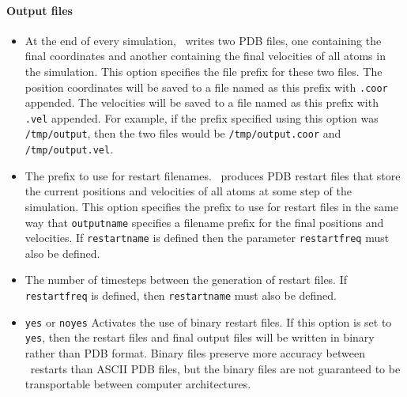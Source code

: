 \paragraph{Output files}

\begin{itemize}
\item
{}
{\label{param:outputname}
At the end of every simulation, \NAMD\ writes two PDB files, one 
containing the final coordinates and another containing 
the final velocities of all atoms in the simulation.  
This option specifies the file prefix for these two files.  
The position coordinates will be saved to a file named as this prefix 
with \verb!.coor! appended.  
The velocities will be saved to a file 
named as this prefix with \verb!.vel! appended.  
For example, 
if the prefix specified using this option was \verb!/tmp/output!, 
then the two files 
would be \verb!/tmp/output.coor! and \verb!/tmp/output.vel!.}

\item
{}
{
The prefix to use for restart filenames.  
\NAMD\ produces PDB restart files 
that store the current positions and velocities of all 
atoms at some step of the simulation.  
This option specifies the prefix to use for restart 
files in the same way that \verb!outputname! 
specifies a filename prefix for the final
positions and velocities.  
If \verb!restartname! is defined then
the parameter \verb!restartfreq! must also be defined.}

\item
{}
{
The number of timesteps between the generation of restart files.  
If \verb!restartfreq! is defined, then \verb!restartname! 
must also be defined.}

\item
{}%
{\verb!yes! or \verb!no!}{\verb!yes!}%
{%
Activates the use of binary restart files.  
If this option is set to \verb!yes!, then the restart 
files and final output files 
will be written in binary rather than PDB format.  
Binary files preserve more accuracy between \NAMD\ restarts 
than ASCII PDB files, 
but the binary files are not guaranteed to be transportable 
between computer architectures.  
}


\end{itemize}
